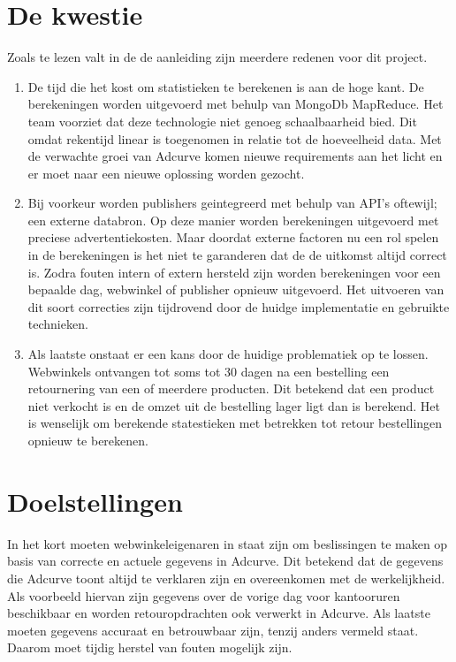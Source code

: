 \pagebreak

\section{De kwestie} %

Zoals te lezen valt in de de aanleiding zijn meerdere redenen voor dit project.

\begin{enumerate}
    \item De tijd die het kost om statistieken te berekenen is aan de hoge kant. De berekeningen worden uitgevoerd met behulp van MongoDb MapReduce. Het team voorziet dat deze technologie niet genoeg schaalbaarheid bied. Dit omdat rekentijd linear is toegenomen in relatie tot de hoeveelheid data. Met de verwachte groei van Adcurve komen nieuwe requirements aan het licht en er moet naar een nieuwe oplossing worden gezocht.
    \item Bij voorkeur worden publishers geintegreerd met behulp van API's oftewijl; een externe databron. Op deze manier worden berekeningen uitgevoerd met preciese advertentiekosten. Maar doordat externe factoren nu een rol spelen in de berekeningen is het niet te garanderen dat de de uitkomst altijd correct is. Zodra fouten intern of extern hersteld zijn worden berekeningen voor een bepaalde dag, webwinkel of publisher opnieuw uitgevoerd. Het uitvoeren van dit soort correcties zijn tijdrovend door de huidge implementatie en gebruikte technieken.
    \item Als laatste onstaat er een kans door de huidige problematiek op te lossen. Webwinkels ontvangen tot soms tot 30 dagen na een bestelling een retournering van een of meerdere producten. Dit betekend dat een product niet verkocht is en de omzet uit de bestelling lager ligt dan is berekend. Het is wenselijk om berekende statestieken met betrekken tot retour bestellingen opnieuw te berekenen.
\end{enumerate}


\section{Doelstellingen} %

In het kort moeten webwinkeleigenaren in staat zijn om beslissingen te maken op basis van correcte en actuele gegevens in Adcurve. Dit betekend dat de gegevens die Adcurve toont altijd te verklaren zijn en overeenkomen met de werkelijkheid. Als voorbeeld hiervan zijn gegevens over de vorige dag voor kantooruren beschikbaar en worden retouropdrachten ook verwerkt in Adcurve. Als laatste moeten gegevens accuraat en betrouwbaar zijn, tenzij anders vermeld staat. Daarom moet tijdig herstel van fouten mogelijk zijn.

